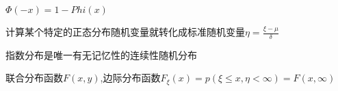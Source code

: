 \documentclass[12pt, a4paper, oneside]{ctexart}
\begin{document}
$\Phi(-x)=1-Phi(x)$

计算某个特定的正态分布随机变量就转化成标准随机变量$\eta = \frac{\xi-\mu}{\delta}$

指数分布是唯一有无记忆性的连续性随机分布



联合分布函数$F(x,y)$,边际分布函数$F_\xi(x)=p(\xi\leq x,\eta <\infty)=F(x,\infty)$









% 
% 
\end{document}

